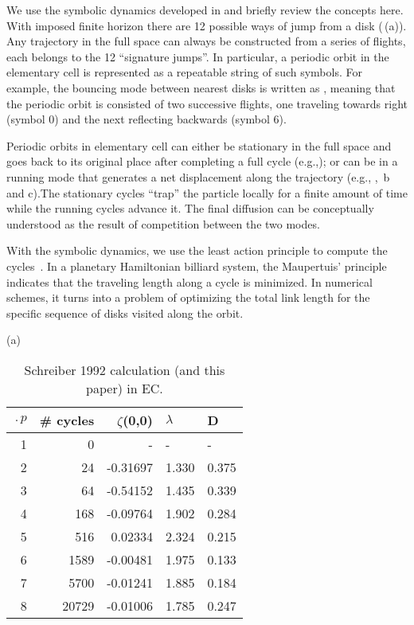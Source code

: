 \documentclass[aps,pre,
                showpacs,
                twocolumn,
                groupedaddress,
                floatfix]{revtex4-1}
\begin{document}
We use the symbolic dynamics developed in  and briefly review the concepts here. With imposed finite horizon there are 12 possible ways of jump from a disk (\,(a)). Any trajectory in the full space can always be constructed from a series of flights, each belongs to  the 12 ``signature jumps''. In particular, a periodic orbit in the elementary cell is represented as a repeatable string of such symbols. For example, the bouncing mode between nearest disks is written as , meaning that the periodic orbit is consisted of two successive flights, one traveling towards right (symbol $0$) and the next reflecting backwards (symbol $6$). 

Periodic orbits in elementary cell can either be stationary in the full space and goes back to its original place after completing a full cycle (e.g.,); or can be in a running mode that generates a net displacement along the trajectory (e.g., , \,b and c).The stationary cycles ``trap'' the  particle locally for a finite amount of time while the running cycles advance it. The final diffusion can be conceptually understood as the result of competition between the two modes.

With the symbolic dynamics, we use the least action principle to compute the cycles~. In a planetary Hamiltonian billiard system, the Maupertuis' principle indicates that the traveling length along a cycle is minimized. In numerical schemes, it turns into a problem of optimizing the total link length for the specific sequence of disks visited along the orbit. 


\begin{table}[htbp]
(a)\\
\begin{tabular}{|r|r|r|l|l|}
\hline
$\period{p}$ & \# cycles & $\zeta$(0,0) & $\lambda$ & D \\ \hline\hline
1      & 0      &   -    &   -  &   - \\
2      & 24     & -0.31697 & 1.330 & 0.375\\
3      & 64     & -0.54152 & 1.435 & 0.339\\
4      & 168    & -0.09764 & 1.902 & 0.284\\
5      & 516    &  0.02334 & 2.324 & 0.215\\
6      & 1589   & -0.00481 & 1.975 & 0.133\\
7      & 5700   & -0.01241 & 1.885 & 0.184\\
8      & 20729  & -0.01006 & 1.785 & 0.247\\ \hline

\end{tabular}
\caption{\label{TCELL1}
Schreiber 1992 calculation (and
  this paper) in EC.
}
\end{table}
\end{document}
